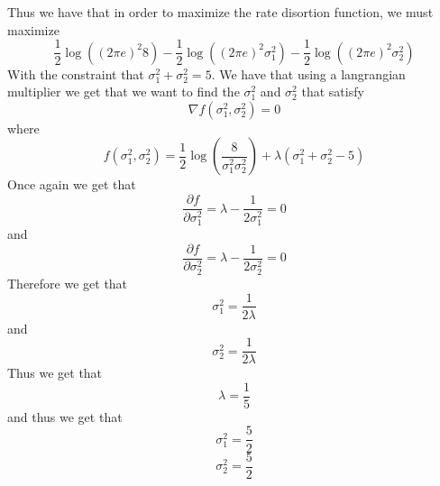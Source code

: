 Thus we have that
in order to maximize the rate disortion function, 
we must maximize 
$$\frac{1}{2}\log((2\pi e)^2 8)-\frac{1}{2}\log((2\pi e)^2 \sigma_1^2)-\frac{1}{2}\log((2\pi e)^2 \sigma_2^2)$$
With the constraint that $\sigma_1^2+\sigma_2^2=5$. We have that
using a langrangian multiplier we get that we want to find the $\sigma_1^2$ and $\sigma_2^2$ that satisfy
$$\nabla f(\sigma_1^2,\sigma_2^2)=0$$
where
$$f(\sigma_1^2,\sigma_2^2)=\frac{1}{2}\log\left(\frac{8}{\sigma_1^2\sigma_2^2}\right)+\lambda(\sigma_1^2+\sigma_2^2-5)$$
Once again we get that 
$$\frac{\partial f}{\partial \sigma_1^2}=\lambda-\frac{1}{2\sigma_1^2}=0$$
and
$$\frac{\partial f}{\partial \sigma_2^2}=\lambda-\frac{1}{2\sigma_2^2}=0$$
Therefore we get that
$$\sigma_1^2=\frac{1}{2\lambda}$$
and
$$\sigma_2^2=\frac{1}{2\lambda}$$
Thus we get that
$$\lambda=\frac{1}{5}$$
and thus we get that
$$\sigma_1^2=\boxed{\frac{5}{2}}$$
$$\sigma_2^2=\boxed{\frac{5}{2}}$$

